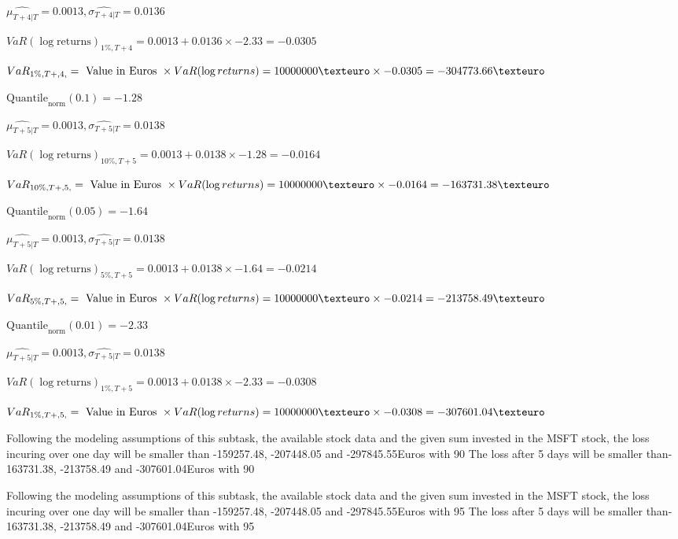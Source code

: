 $\hat{\mu_{T+4|T}} = 0.0013, \hat{\sigma_{T+4|T}} = 0.0136$

$VaR(\log \text{returns})_{1\%, T + 4} = 0.0013 + 0.0136\times-2.33 = -0.0305$

$VaR_{1\%, T + ,4,} = \text{ Value in Euros } \times VaR(\log returns) = 10 000 000 \texteuro \times-0.0305 = -304773.66 \texteuro$


$\text{Quantile}_\text{norm}(0.1) = -1.28$

$\hat{\mu_{T+5|T}} = 0.0013, \hat{\sigma_{T+5|T}} = 0.0138$

$VaR(\log \text{returns})_{10\%, T + 5} = 0.0013 + 0.0138\times-1.28 = -0.0164$

$VaR_{10\%, T + ,5,} = \text{ Value in Euros } \times VaR(\log returns) = 10 000 000 \texteuro \times-0.0164 = -163731.38 \texteuro$


$\text{Quantile}_\text{norm}(0.05) = -1.64$

$\hat{\mu_{T+5|T}} = 0.0013, \hat{\sigma_{T+5|T}} = 0.0138$

$VaR(\log \text{returns})_{5\%, T + 5} = 0.0013 + 0.0138\times-1.64 = -0.0214$

$VaR_{5\%, T + ,5,} = \text{ Value in Euros } \times VaR(\log returns) = 10 000 000 \texteuro \times-0.0214 = -213758.49 \texteuro$


$\text{Quantile}_\text{norm}(0.01) = -2.33$

$\hat{\mu_{T+5|T}} = 0.0013, \hat{\sigma_{T+5|T}} = 0.0138$

$VaR(\log \text{returns})_{1\%, T + 5} = 0.0013 + 0.0138\times-2.33 = -0.0308$

$VaR_{1\%, T + ,5,} = \text{ Value in Euros } \times VaR(\log returns) = 10 000 000 \texteuro \times-0.0308 = -307601.04 \texteuro$


Following the modeling assumptions of this subtask, the available stock data and the given sum invested in the MSFT stock, the loss incuring over one day will be smaller than -159257.48, -207448.05 and -297845.55Euros with 90%
The loss after 5 days will be smaller than-163731.38, -213758.49 and -307601.04Euros with 90%
 

Following the modeling assumptions of this subtask, the available stock data and the given sum invested in the MSFT stock, the loss incuring over one day will be smaller than -159257.48, -207448.05 and -297845.55Euros with 95%
The loss after 5 days will be smaller than-163731.38, -213758.49 and -307601.04Euros with 95%
 

